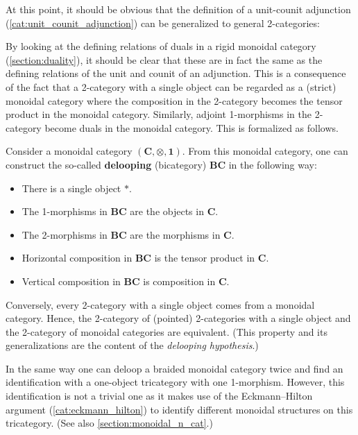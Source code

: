     At this point, it should be obvious that the definition of a unit-counit adjunction (\cref{cat:unit_counit_adjunction}) can be generalized to general 2-categories:

    By looking at the defining relations of duals in a rigid monoidal category (\cref{section:duality}), it should be clear that these are in fact the same as the defining relations of the unit and counit of an adjunction. This is a consequence of the fact that a 2-category with a single object can be regarded as a (strict) monoidal category where the composition in the 2-category becomes the tensor product in the monoidal category. Similarly, adjoint 1-morphisms in the 2-category become duals in the monoidal category. This is formalized as follows.
    \begin{property}\label{cat:monoidal_or_2}
        Consider a monoidal category $(\mathbf{C},\otimes,\mathbf{1})$. From this monoidal category, one can construct the so-called \textbf{delooping} (bicategory) $\mathbf{BC}$ in the following way:
        \begin{itemize}
            \item There is a single object $\ast$.
            \item The 1-morphisms in $\mathbf{BC}$ are the objects in $\mathbf{C}$.
            \item The 2-morphisms in $\mathbf{BC}$ are the morphisms in $\mathbf{C}$.
            \item Horizontal composition in $\mathbf{BC}$ is the tensor product in $\mathbf{C}$.
            \item Vertical composition in $\mathbf{BC}$ is composition in $\mathbf{C}$.
        \end{itemize}
        Conversely, every 2-category with a single object comes from a monoidal category. Hence, the 2-category of (pointed) 2-categories with a single object and the 2-category of monoidal categories are equivalent. (This property and its generalizations are the content of the \textit{delooping hypothesis}.)

        In the same way one can deloop a braided monoidal category twice and find an identification with a one-object tricategory with one 1-morphism. However, this identification is not a trivial one as it makes use of the Eckmann--Hilton argument (\cref{cat:eckmann_hilton}) to identify different monoidal structures on this tricategory. (See also \cref{section:monoidal_n_cat}.)
    \end{property}

